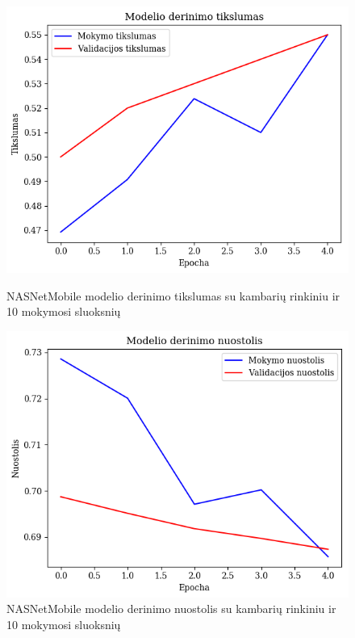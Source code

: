 \documentclass{VUMIFPSbakalaurinis}
\begin{document}
\begin{figure}[!htbp]
    \centering
    \begin{minipage}[b]{0.48\textwidth}
      \includegraphics[width=\textwidth]{img/GrapthsNEW/Small/room/10/Acc_R_S_10.png}
      \caption{NASNetMobile modelio derinimo tikslumas su kambarių rinkiniu ir 10 mokymosi sluoksnių}
    \end{minipage}
    \hspace{2mm}
    \begin{minipage}[b]{0.48\textwidth}
      \includegraphics[width=\textwidth]{img/GrapthsNEW/Small/room/10/Loss_R_S_10.png}
      \caption{NASNetMobile modelio derinimo nuostolis su kambarių rinkiniu ir 10 mokymosi sluoksnių}
    \end{minipage}
\end{figure}
\end{document}
